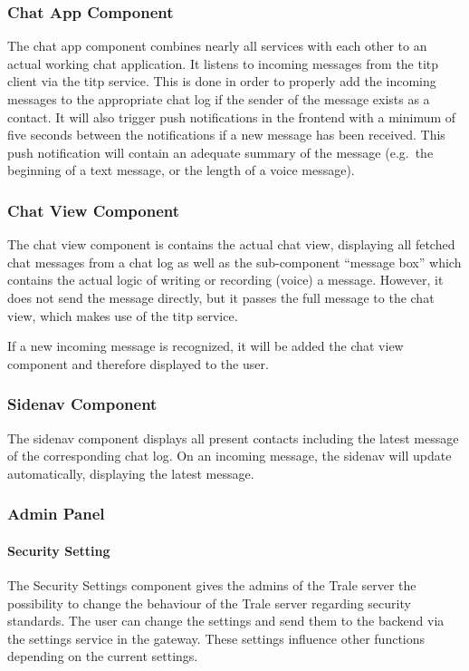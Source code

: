 \subsubsection{Chat App Component}
The chat app component combines nearly all services with each other to an actual working chat application.
It listens to incoming messages from the \ac{titp} client via the \ac{titp} service.
This is done in order to properly add the incoming messages to the appropriate chat log if the sender of the message
exists as a contact.
It will also trigger push notifications in the frontend with a minimum of five seconds between the notifications if a
new message has been received.
This push notification will contain an adequate summary of the message (e.g.\ the beginning of a text message, or the
length of a voice message).

\subsubsection{Chat View Component}
The chat view component is contains the actual chat view, displaying all fetched chat messages from a chat log as well
as the sub-component \enquote{message box} which contains the actual logic of writing or recording (voice) a message.
However, it does not send the message directly, but it passes the full message to the chat view, which makes use of the
\ac{titp} service.

If a new incoming message is recognized, it will be added the chat view component and therefore displayed to the user.

\subsubsection{Sidenav Component}
The sidenav component displays all present contacts including the latest message of the corresponding chat log.
On an incoming message, the sidenav will update automatically, displaying the latest message.

\subsubsection{Admin Panel}

\paragraph{Security Setting}
The Security Settings component gives the admins of the Trale server the possibility to change the behaviour of the
Trale server regarding security standards.
The user can change the settings and send them to the backend via the settings service in the gateway.
These settings influence other functions depending on the current settings.

